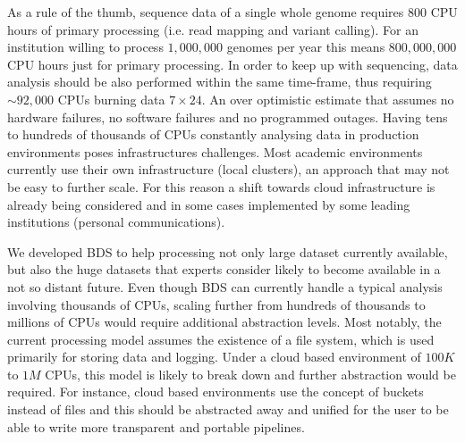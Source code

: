 As a rule of the thumb, sequence data of a single whole genome requires $800$ CPU hours of primary processing (i.e. read mapping and variant calling).
For an institution willing to process $1,000,000$ genomes per year this means $800,000,000$ CPU hours just for primary processing.
In order to keep up with sequencing, data analysis should be also performed within the same time-frame, thus requiring $\sim 92,000$ CPUs burning data $7 \times 24$.
An over optimistic estimate that assumes no hardware failures, no software failures and no programmed outages.
Having tens to hundreds of thousands of CPUs constantly analysing data in production environments poses infrastructures challenges.
Most academic environments currently use their own infrastructure (local clusters), an approach that may not be easy to further scale.
For this reason a shift towards cloud infrastructure is already being considered and in some cases implemented by some leading institutions (personal communications).

We developed BDS to help processing not only large dataset currently available, but also the huge datasets that experts consider likely to become available in a not so distant future.
Even though BDS can currently handle a typical analysis involving thousands of CPUs, scaling further from hundreds of thousands to millions of CPUs would require additional abstraction levels.
Most notably, the current processing model assumes the existence of a file system, which is used primarily for storing data and logging.
Under a cloud based environment of $100K$ to $1M$ CPUs, this model is likely to break down and further abstraction would be required.
For instance, cloud based environments use the concept of buckets instead of files and this should be abstracted away and unified for the user to be able to write more transparent and portable pipelines.

